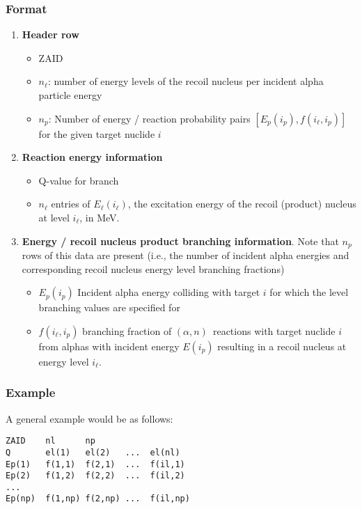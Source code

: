 \documentclass[10pt]{article}
\newcommand{\alphn}[0]{$\left(\alpha,n\right)$}
\begin{document}
\subsubsection{Format}
\begin{enumerate}
\item \textbf{Header row}
\begin{itemize}
\item ZAID
\item $n_\ell$: number of energy levels of the recoil nucleus per incident alpha particle energy
\item $n_p$: Number of energy / reaction probability pairs $\left[ E_p\left(i_p\right), f\left(i_\ell, i_p\right) \right]$ for the given target nuclide $i$
\end{itemize}
\item \textbf{Reaction energy information}
\begin{itemize}
\item Q-value for branch
\item $n_\ell$ entries of $E_\ell \left( i_\ell \right)$, the excitation energy of the recoil (product) nucleus at level $i_\ell$, in MeV.
\end{itemize}
\item \textbf{Energy / recoil nucleus product branching information}. Note that $n_p$ rows of this data are present (i.e., the number of incident alpha energies and corresponding recoil nucleus energy level branching fractions)
\begin{itemize}
\item $E_p\left(i_p\right)$ Incident alpha energy colliding with target $i$ for which the level branching values are specified for
\item $f\left(i_\ell, i_p \right)$ branching fraction of \alphn\ reactions with target nuclide $i$ from alphas with incident energy $E\left(i_p\right)$ resulting in a recoil nucleus at energy level $i_\ell$.
\end{itemize}
\end{enumerate}

\subsubsection{Example}
\label{sec:branching}

A general example would be as follows:
\begin{Verbatim}[frame=single]
ZAID    nl      np
Q       el(1)   el(2)   ...  el(nl)
Ep(1)   f(1,1)  f(2,1)  ...  f(il,1)
Ep(2)   f(1,2)  f(2,2)  ...  f(il,2)
...
Ep(np)  f(1,np) f(2,np) ...  f(il,np) 
\end{Verbatim}
\end{document}
